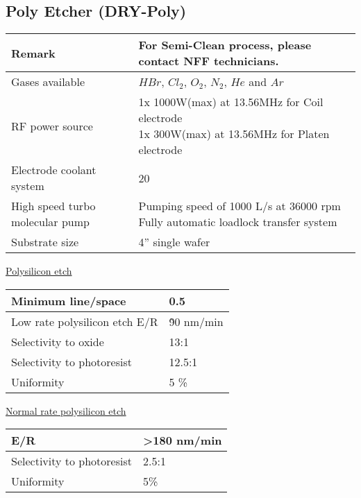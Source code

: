 \subsection{Poly Etcher (DRY-Poly)}\label{poly_etcher_machine}
\WaferClean\WaferSemiClean

\begin{minipage}[H]{\MachinePictureMiniPageWidth}
\end{minipage}\begin{minipage}[H]{\MachineTextMiniPageWidth}
	\begin{tabular}{|p{3cm}|p{8cm}|}
		\hline
		Remark &
		For Semi-Clean process, please contact NFF technicians. \\
		\hline
		Gases available &
		$H Br$, $Cl_2$, $O_2$, $N_2$, $He$ and $Ar$ \\
		\hline
		RF power source &
		\makecell[l]{
			\tabitem 1x 1000W(max) at 13.56MHz for Coil electrode \\
			\tabitem 1x 300W(max)  at 13.56MHz for Platen electrode
		} \\
		\hline
		Electrode coolant system &
		20 \degreesC \\
		\hline
		High speed turbo molecular pump &
		\makecell[l]{
			\tabitem Pumping speed of 1000 L/s at 36000 rpm \\
			\tabitem Fully automatic loadlock transfer system
		} \\
		\hline
		Substrate size &
		4” single wafer \\
		\hline
	\end{tabular}

	\underline{Polysilicon etch}

	\begin{tabular}{|p{5cm}|p{6cm}|}
		\hline
		Minimum line/space &
		0.5\um \\
		\hline
		Low rate polysilicon etch E/R &
		\~ 90 nm/min \\
		\hline
		Selectivity to oxide &
		13:1 \\
		\hline
		Selectivity to photoresist &
		12.5:1 \\
		\hline
		Uniformity &
		5 \% \\
		\hline
	\end{tabular}

	\underline{Normal rate polysilicon etch}

	\begin{tabular}{|p{5cm}|p{6cm}|}
		\hline
		E/R &
		>180 nm/min \\
		\hline
		Selectivity to photoresist &
		2.5:1 \\
		\hline
		Uniformity &
		5\% \\
		\hline
	\end{tabular}
\end{minipage}
